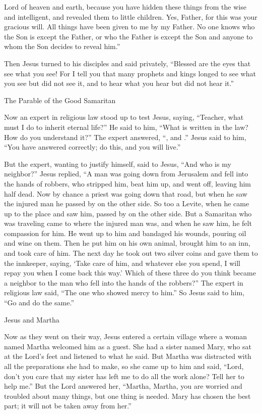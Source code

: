 {Lord
of heaven
and
earth,
because
you have hidden
these things
from
the wise
and
intelligent,
and
revealed
them
to little children.
Yes,
Father,
for
this was
your
gracious will.
All things
have been given
to me
by
my
Father.
No one
knows
who
the Son
is
except
the Father,
or
who
the Father
is
except
the Son
and
anyone
to whom
the Son
decides
to reveal him.”
\par }{\PP {}Then
Jesus turned
to
his disciples
and said
privately,
“Blessed
are the eyes
that see
what
you see!
For
I tell
you
that
many
prophets
and
kings
longed
to see
what
you
see
but
did
not
see
it, and
to hear
what
you hear
but
did
not
hear it.”
\par }{\SH The Parable of the Good Samaritan
\par }{\PP {}Now
an expert in religious law
stood up
to test
Jesus,
saying,
“Teacher,
what
must I do
to inherit
eternal
life?”
He said
to
him,
“What
is written
in
the law? How
do you understand it?”
The expert answered, “{}, and
{}.”
Jesus said
to him,
“You have answered
correctly;
do
this,
and
you will live.”
\par }{\PP {}But
the expert, wanting
to justify
himself,
said
to
Jesus,
“And
who
is
my
neighbor?”
Jesus
replied, “A man
was going down
from
Jerusalem
and
fell into the hands
of robbers,
who stripped
him,
beat
him up,
and went off,
leaving
him half dead.
Now by
chance
a priest
was going down
that
road,
but
when
he saw
the injured man
he passed by on the other side.
So too
a Levite,
when he came up
to the place
and
saw
him, passed by on the other side.
But
a Samaritan
who was traveling
came to
where
the injured man
was, and
when
he saw
him, he felt compassion for him.
He
went up
to him and bandaged
his
wounds,
pouring
oil
and
wine
on them. Then
he put
him
on
his own
animal,
brought
him
to
an inn,
and
took care of
him.
The next
day he took out
two
silver coins
and gave
them to the innkeeper,
saying,
‘Take care of
him,
and
whatever
else you spend,
I will repay
you
when I
come back this way.’
Which
of these
three
do
you
think
became
a neighbor
to the man who fell
into
the hands of the robbers?”
The expert in religious law said,
“The one who showed
mercy
to
him.”
So
Jesus
said
to him,
“Go
and
do
the same.”
\par }{\SH Jesus and Martha
\par }{\PP {}Now
as they went on
their way,
Jesus
entered
a certain
village
where
a woman
named
Martha
welcomed
him
as
a guest.
She had
a sister
named
Mary,
who
sat
at
the Lord’s
feet
and
listened
to what he
said.
But
Martha
was distracted
with
all
the preparations she had to make,
so
she came up
to him and said,
“Lord,
don’t
you
care
that
my
sister
has left
me
to do
all the work
alone? Tell
her
to
help
me.”
But
the Lord
answered
her, “Martha,
Martha,
you are worried
and
troubled
about
many things,
but
one thing
is
needed.
Mary
has chosen
the best
part;
it will
not
be taken away from
her.”

}
